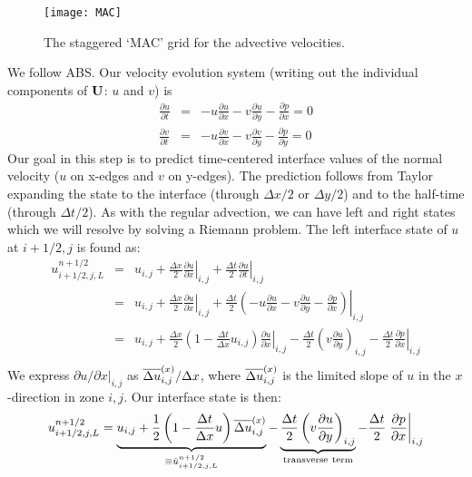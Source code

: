 \begin{figure}[h]
\centering
\texttt{[image: MAC]}
\caption[MAC grid for velocity]
  {\label{fig:MAC} The staggered `MAC' grid for the advective
  velocities.}
\end{figure}


We follow ABS.  Our velocity evolution system (writing out the
individual components of ${\bf U}$: $u$ and $v$) is
\begin{eqnarray}
\frac{\partial u}{\partial t} &=& -u \frac{\partial u}{\partial x} 
                                  -v \frac{\partial u}{\partial y} 
                                  -\frac{\partial p}{\partial x} = 0 \\
\frac{\partial v}{\partial t} &=& -u \frac{\partial v}{\partial x} 
                                  -v \frac{\partial v}{\partial y} 
                                  -\frac{\partial p}{\partial y} = 0 
\end{eqnarray}
Our goal in this step is to predict time-centered interface values of
the normal velocity ($u$ on x-edges and $v$ on y-edges).  The
prediction follows from Taylor expanding the state to the interface
(through $\Delta x/2$ or $\Delta y/2$) and to the half-time (through
$\Delta t/2$).  As with the regular advection, we can have left and
right states which we will resolve by solving a Riemann problem.  The
left interface state of $u$ at $i+1/2,j$ is found as:
\begin{eqnarray}
u_{i+1/2,j,L}^{n+1/2} 
  &=& u_{i,j} 
    + \frac{\Delta x}{2} \left . \frac{\partial u}{\partial x} \right |_{i,j}
    + \frac{\Delta t}{2} \left . \frac{\partial u}{\partial t} \right |_{i,j}\\
  &=& u_{i,j} 
    + \frac{\Delta x}{2} \left . \frac{\partial u}{\partial x} \right |_{i,j}
    + \frac{\Delta t}{2} \left . \left (-u \frac{\partial u}{\partial x}
                                -v \frac{\partial u}{\partial y}
                                -\frac{\partial p}{\partial x} \right ) \right |_{i,j}\\
  &=& u_{i,j} 
    + \frac{\Delta x}{2} \left ( 1 - \frac{\Delta t}{\Delta x} u_{i,j} \right )
                         \left .  \frac{\partial u}{\partial x}\right |_{i,j}
    - \frac{\Delta t}{2} \left ( v \frac{\partial u}{\partial y}\right )_{i,j}
    - \frac{\Delta t}{2} \left . \frac{\partial p}{\partial x} \right |_{i,j}\\
\end{eqnarray}
We express ${\partial u}/{\partial x} |_{i,j}$ as $\overline{\Delta u}^{(x)}_{i,j} / \Delta
x$, where $\overline{\Delta u}^{(x)}_{i,j}$ is the limited slope of $u$ in the
$x$-direction in zone $i,j$.  Our interface state is then:
\begin{equation}
u_{i+1/2,j,L}^{n+1/2} 
    = \underbrace{u_{i,j} + \frac{1}{2} \left ( 1 - \frac{\Delta t}{\Delta x} u \right ) \overline{\Delta u}^{(x)}_{i,j}}_{\equiv \hat{u}_{i+1/2,j,L}^{n+1/2}}
    - \underbrace{\frac{\Delta t}{2} \left ( v \frac{\partial u}{\partial y} \right )_{i,j}}_{\mathrm{transverse~term}}
    - \frac{\Delta t}{2} \left . \frac{\partial p}{\partial x} \right |_{i,j}
\label{eq:uMAC_l}
\end{equation} 


